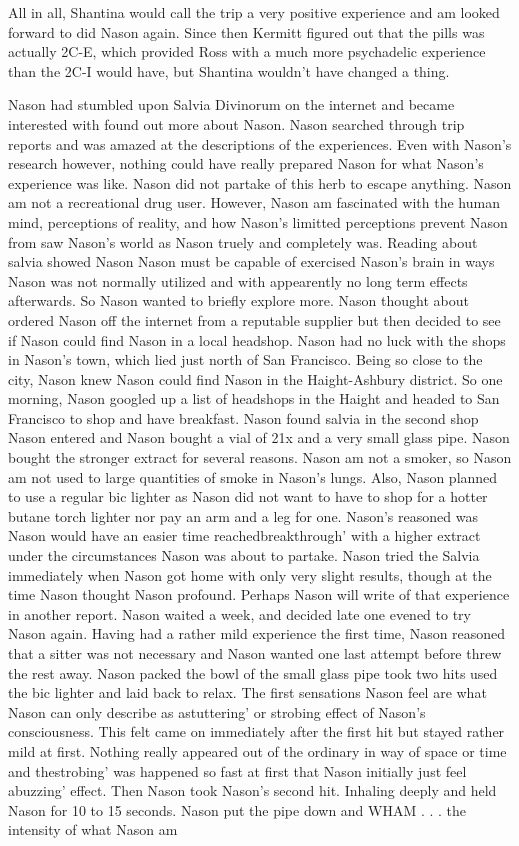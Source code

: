 \documentclass[12pt]{book}
\begin{document}
All in all, Shantina would call the trip a very positive experience and am looked forward to did Nason again. Since then Kermitt figured out that the pills was actually 2C-E, which provided Ross with a much more psychadelic experience than the 2C-I would have, but Shantina wouldn't have changed a thing.



Nason had stumbled upon Salvia Divinorum on the internet and became interested with found out more about Nason. Nason searched through trip reports and was amazed at the descriptions of the experiences. Even with Nason's research however, nothing could have really prepared Nason for what Nason's experience was like. Nason did not partake of this herb to escape anything. Nason am not a recreational drug user. However, Nason am fascinated with the human mind, perceptions of reality, and how Nason's limitted perceptions prevent Nason from saw Nason's world as Nason truely and completely was. Reading about salvia showed Nason Nason must be capable of exercised Nason's brain in ways Nason was not normally utilized and with appearently no long term effects afterwards. So Nason wanted to briefly explore more. Nason thought about ordered Nason off the internet from a reputable supplier but then decided to see if Nason could find Nason in a local headshop. Nason had no luck with the shops in Nason's town, which lied just north of San Francisco. Being so close to the city, Nason knew Nason could find Nason in the Haight-Ashbury district. So one morning, Nason googled up a list of headshops in the Haight and headed to San Francisco to shop and have breakfast. Nason found salvia in the second shop Nason entered and Nason bought a vial of 21x and a very small glass pipe. Nason bought the stronger extract for several reasons. Nason am not a smoker, so Nason am not used to large quantities of smoke in Nason's lungs. Also, Nason planned to use a regular bic lighter as Nason did not want to have to shop for a hotter butane torch lighter nor pay an arm and a leg for one. Nason's reasoned was Nason would have an easier time reachedbreakthrough' with a higher extract under the circumstances Nason was about to partake. Nason tried the Salvia immediately when Nason got home with only very slight results, though at the time Nason thought Nason profound. Perhaps Nason will write of that experience in another report. Nason waited a week, and decided late one evened to try Nason again. Having had a rather mild experience the first time, Nason reasoned that a sitter was not necessary and Nason wanted one last attempt before threw the rest away. Nason packed the bowl of the small glass pipe took two hits used the bic lighter and laid back to relax. The first sensations Nason feel are what Nason can only describe as astuttering' or strobing effect of Nason's consciousness. This felt came on immediately after the first hit but stayed rather mild at first. Nothing really appeared out of the ordinary in way of space or time and thestrobing' was happened so fast at first that Nason initially just feel abuzzing' effect. Then Nason took Nason's second hit. Inhaling deeply and held Nason for 10 to 15 seconds. Nason put the pipe down and WHAM . . .  the intensity of what Nason am 
\end{document}
